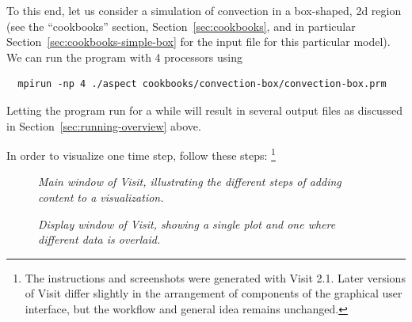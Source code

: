 \documentclass{article}
\begin{document}
To this end, let us consider a simulation of convection in a box-shaped, 2d
region (see the ``cookbooks'' section, Section~\ref{sec:cookbooks}, and in
particular Section~\ref{sec:cookbooks-simple-box} for
the input file for this particular model). We can run the program with 4 processors using
\begin{verbatim}
  mpirun -np 4 ./aspect cookbooks/convection-box/convection-box.prm
\end{verbatim}
Letting the program run for a while will result in several output files as
discussed in Section~\ref{sec:running-overview} above.

In order to visualize one time step, follow these steps:%
\footnote{The instructions and screenshots were generated with Visit
  2.1. Later versions of Visit differ slightly in the arrangement of
  components of the graphical user interface, but the workflow and general
  idea remains unchanged.}

\begin{figure}[tbp]
  \phantom{.}
  \hfill
  \hfill
  \hfill
  \hfill
  \phantom{.}
  \caption{\it Main window of Visit, illustrating the different steps of
    adding content to a visualization.}
  \label{fig:visit-1}
\end{figure}

\begin{figure}[tbp]
  \phantom{.}
  \hfill
  \hfill
  \hfill
  \phantom{.}
  \caption{\it Display window of Visit, showing a single plot and one where
    different data is overlaid.}
  \label{fig:visit-2}
\end{figure}
\end{document}
